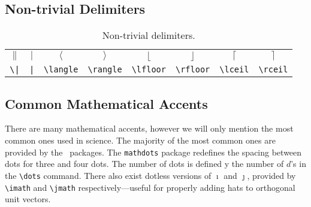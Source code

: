 \subsection{Non-trivial Delimiters}
%
\begin{table}[!htbp]
    \centering
    \caption{Non-trivial delimiters.}
    \label{t:ntd}
    \begin{tabular}{cccccccc}
        $\|$ & $|$ & $\langle$ & $\rangle$ & $\lfloor$ & $\rfloor$ & $\lceil$ & $\rceil$ \\
        \verb+\|+ & \verb+|+ & \verb|\langle| & \verb|\rangle| & \verb|\lfloor| & \verb|\rfloor| & \verb|\lceil| & \verb|\rceil| \\
    \end{tabular}
\end{table}
%
\subsection{Common Mathematical Accents}
%
There are many mathematical accents, however we will only mention the most common ones used in science. The majority of the most common ones are provided by the \AmSTeX~packages. The \verb|mathdots| package redefines the spacing between dots for three and four dots. The number of dots is defined y the number of $d$'s in the \verb|\dots| command. There also exist dotless versions of $\imath$ and $\jmath$, provided by \verb|\imath| and \verb|\jmath| respectively---useful for properly adding hats to orthogonal unit vectors.

